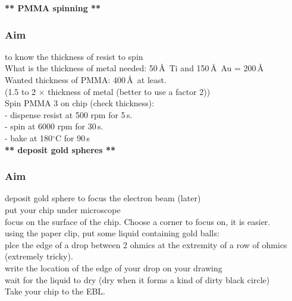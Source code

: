 \textbf{** PMMA spinning **}\\

\subsubsection{Aim}
to know the thickness of resist to spin\\

What is the thickness of metal needed: 50\,\AA~Ti and 150\,\AA~Au = 200\,\AA \\

Wanted thickness of PMMA: 400\,\AA  ~at least.\\
(1.5 to 2 $\times$ thickness of metal (better to use a factor 2))\\


Spin PMMA 3 on chip (check thickness):\\
- dispense resist at 500 rpm for 5\,s.\\
- spin at 6000 rpm for 30\,s.\\
- bake at 180$^{\circ}$C for 90\,s\\


\textbf{** deposit gold spheres **}\\

\subsubsection{Aim}
deposit gold sphere to focus the electron beam (later)\\

put your chip under microscope\\

focus on the surface of the chip. Choose a corner to focus on, it is easier.\\

using the paper clip, put some liquid containing gold balls:\\
plce the edge of a drop between 2 ohmics at the extremity of a row of ohmics (extremely tricky).\\

write the location of the edge of your drop on your drawing\\

wait for the liquid to dry (dry when it forms a kind of dirty black circle)\\

Take your chip to the EBL.\\

\newpage


